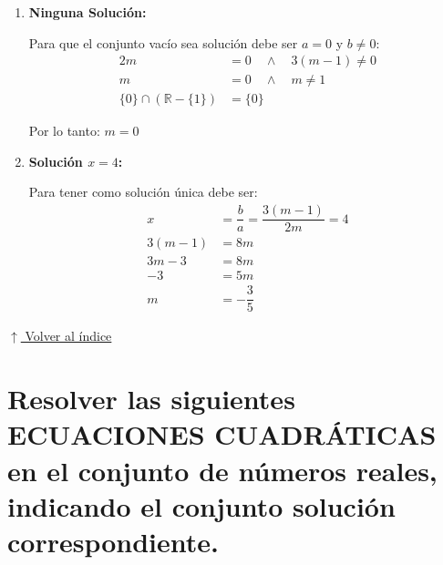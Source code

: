 \documentclass[12pt]{article}
\newcommand{\volverindice}{%
    \vspace{1em}%
    \begin{flushright}%
        \hyperlink{indice}{\small $\uparrow$ Volver al índice}%
    \end{flushright}%
}
\begin{document}
\begin{enumerate}[label=\roman*)]
\begin{enumerate}[label=\alph*)]
    No existe valor de $m$ para infinitas soluciones.

    \item \textbf{Ninguna Solución:}

    Para que el conjunto vacío sea solución debe ser $a = 0$ y $b \neq 0$:
    \begin{align*}
    2m &= 0 \quad \land \quad 3(m - 1) \neq 0 \\
    m &= 0 \quad \land \quad m \neq 1 \\
    \{0\} \cap (\mathbb{R} - \{1\}) &= \{0\}
    \end{align*}

    Por lo tanto: $m = 0$

    \item \textbf{Solución $x = 4$:}

    Para tener como solución única debe ser:
    \begin{align*}
    x &= \dfrac{b}{a} = \dfrac{3(m - 1)}{2m} = 4 \\[0.3em]
    3(m - 1) &= 8m \\[0.3em]
    3m - 3 &= 8m \\[0.3em]
    -3 &= 5m \\[0.3em]
    m &= -\dfrac{3}{5}
    \end{align*}
    \end{enumerate}
\end{enumerate}

\volverindice
\newpage

\section[Ecuaciones cuadráticas]{Resolver las siguientes ECUACIONES CUADRÁTICAS en el conjunto de números reales, indicando el conjunto solución correspondiente.}
\end{document}
